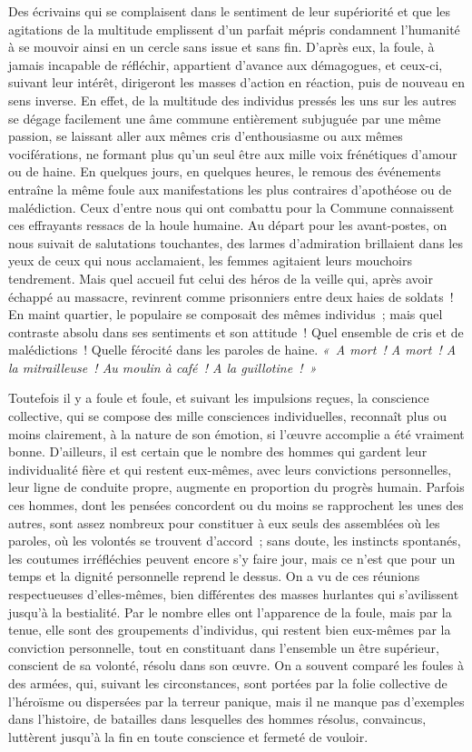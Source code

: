 \documentclass[french,twoside]{book} %
\begin{document}
Des écrivains qui se complaisent dans le sentiment de leur supériorité et que les agitations de la multitude emplissent  d’un parfait mépris condamnent l’humanité à se mouvoir ainsi en un cercle sans issue et sans fin. D’après eux, la foule, à jamais incapable de réfléchir, appartient d’avance aux démagogues, et ceux-ci, suivant leur intérêt, dirigeront les masses d’action en réaction, puis de nouveau en sens inverse. En effet, de la multitude des individus pressés les uns sur les autres se dégage facilement une âme commune entièrement subjuguée par une même passion, se laissant aller aux mêmes cris d’enthousiasme ou aux mêmes vociférations, ne formant plus qu’un seul être aux mille voix frénétiques d’amour ou de haine. En quelques jours, en quelques heures, le remous des événements entraîne la même foule aux manifestations les plus contraires  d’apothéose ou de malédiction. Ceux d’entre nous qui ont combattu pour la Commune connaissent ces effrayants ressacs de la houle humaine. Au départ pour les avant-postes, on nous suivait de salutations touchantes, des larmes d’admiration brillaient dans les yeux de ceux qui nous acclamaient, les femmes agitaient leurs mouchoirs tendrement. Mais quel accueil fut celui des héros de la veille qui, après avoir échappé au massacre, revinrent comme prisonniers entre deux haies de soldats ! En maint quartier, le populaire se composait des mêmes individus ; mais quel contraste absolu dans ses sentiments et son attitude ! Quel ensemble de cris et de malédictions ! Quelle férocité dans les paroles de haine. \emph{« A mort ! A mort !  A la mitrailleuse ! Au \emph{moulin à café !} A la guillotine ! »}\par
Toutefois il y a foule et foule, et suivant les impulsions reçues, la conscience collective, qui se compose des mille consciences individuelles, reconnaît plus ou moins clairement, à la nature de son émotion, si l’œuvre accomplie a été vraiment bonne. D’ailleurs, il est certain que le nombre des hommes qui gardent leur individualité fière et qui restent eux-mêmes, avec leurs convictions personnelles, leur ligne de conduite propre, augmente en proportion du progrès humain. Parfois ces hommes, dont les pensées concordent ou du moins se rapprochent les unes des autres, sont assez nombreux pour constituer à eux seuls des assemblées où les paroles, où  les volontés se trouvent d’accord ; sans doute, les instincts spontanés, les coutumes irréfléchies peuvent encore s’y faire jour, mais ce n’est que pour un temps et la dignité personnelle reprend le dessus. On a vu de ces réunions respectueuses d’elles-mêmes, bien différentes des masses hurlantes qui s’avilissent jusqu’à la bestialité. Par le nombre elles ont l’apparence de la foule, mais par la tenue, elle sont des groupements d’individus, qui restent bien eux-mêmes par la conviction personnelle, tout en constituant dans l’ensemble un être supérieur, conscient de sa volonté, résolu dans son œuvre. On a souvent comparé les foules à des armées, qui, suivant les circonstances, sont portées par la folie collective de l’héroïsme ou dispersées  par la terreur panique, mais il ne manque pas d’exemples dans l’histoire, de batailles dans lesquelles des hommes résolus, convaincus, luttèrent jusqu’à la fin en toute conscience et fermeté de vouloir.\par
\end{document}
